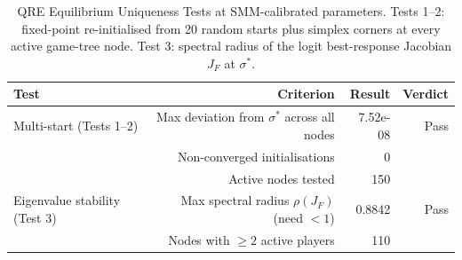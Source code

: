 \begin{table}[htbp]
\centering
\small
\caption{QRE Equilibrium Uniqueness Tests at SMM-calibrated parameters. Tests 1--2: fixed-point re-initialised from 20 random starts plus simplex corners at every active game-tree node. Test 3: spectral radius of the logit best-response Jacobian $J_F$ at $\sigma^*$.}
\label{tab:equilibrium_uniqueness}
\begin{tabular}{lrrr}
\toprule
\textbf{Test} & \textbf{Criterion} & \textbf{Result} & \textbf{Verdict} \\
\midrule
Multi-start (Tests 1--2) & Max deviation from $\sigma^*$ across all nodes & 7.52e-08 & Pass \\
 & Non-converged initialisations & 0 &  \\
 & Active nodes tested & 150 &  \\
\midrule
Eigenvalue stability (Test 3) & Max spectral radius $\rho(J_F)$ (need $< 1$) & 0.8842 & Pass \\
 & Nodes with $\geq 2$ active players & 110 &  \\
\bottomrule
\end{tabular}
\end{table}